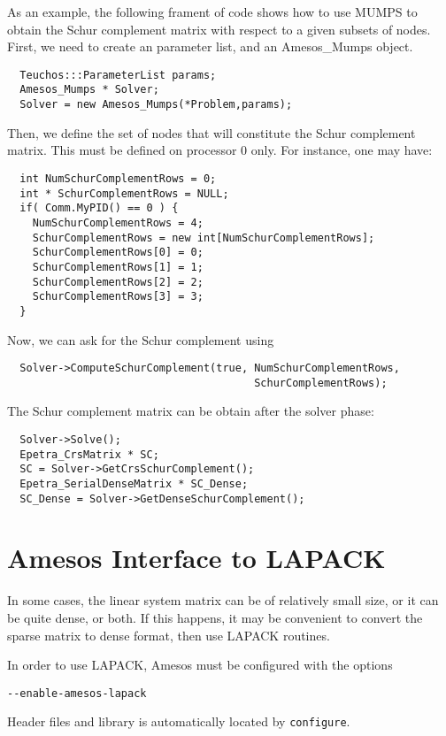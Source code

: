 \documentclass[11pt]{SANDreport}
\begin{document}
As an example, the following frament of code shows how to use MUMPS to
obtain the Schur complement matrix with respect to a given subsets of
nodes.  First, we need to create an parameter list, and an Amesos\_Mumps
object.
\begin{verbatim}
  Teuchos:::ParameterList params;
  Amesos_Mumps * Solver;
  Solver = new Amesos_Mumps(*Problem,params);
\end{verbatim}
Then, we define the set of nodes that will constitute the Schur
complement matrix. This must be defined on processor 0 only. For
instance, one may have:
\begin{verbatim}
  int NumSchurComplementRows = 0;
  int * SchurComplementRows = NULL;
  if( Comm.MyPID() == 0 ) {
    NumSchurComplementRows = 4;
    SchurComplementRows = new int[NumSchurComplementRows];
    SchurComplementRows[0] = 0;
    SchurComplementRows[1] = 1; 
    SchurComplementRows[2] = 2;
    SchurComplementRows[3] = 3;
  }
\end{verbatim}
Now, we can ask for the Schur complement using
\begin{verbatim}  
  Solver->ComputeSchurComplement(true, NumSchurComplementRows,
                                       SchurComplementRows);
\end{verbatim}
The Schur complement matrix can be obtain after the solver phase:  
\begin{verbatim}  
  Solver->Solve();
  Epetra_CrsMatrix * SC;
  SC = Solver->GetCrsSchurComplement();
  Epetra_SerialDenseMatrix * SC_Dense;
  SC_Dense = Solver->GetDenseSchurComplement();
\end{verbatim}

\section{Amesos Interface to LAPACK}
\label{sec:lapack}

In some cases, the linear system matrix can be of relatively small size,
  or it can be quite dense, or both. If this happens, it may be convenient
  to convert the sparse matrix to dense format, then use LAPACK routines.

\smallskip

In order to use LAPACK, Amesos must be configured with the options
\begin{verbatim}
--enable-amesos-lapack 
\end{verbatim}
Header files and library is automatically located by {\tt configure}.
\end{document}
